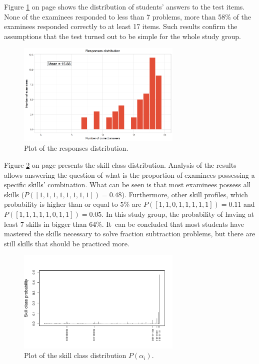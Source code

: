 \documentclass[english]{pwr_wmat_praca_dyplomowa}
\theoremstyle{plain}
\numberwithin{theorem}{chapter}
\theoremstyle{definition}
\numberwithin{theorem}{chapter}
\begin{document}
	Figure \ref{histogram_ans} on page \pageref{histogram_ans} shows the distribution of students' answers to the test items. None of the examinees responded to less than 7 problems, more than 58\% of the examinees responded correctly to at least 17 items. Such results confirm the assumptions that the test turned out to be simple for the whole study group. 
	
	\begin{figure}[h!]
		\centering
		\includegraphics[width=0.7\textwidth]{Responses_distribution.png}
		\caption{Plot of the responses distribution.}
		\label{histogram_ans}
	\end{figure}
	
	Figure \ref{skill_class_dist} on page \pageref{skill_class_dist} presents the skill class distribution. Analysis of the results allows answering the question of what is the proportion of examinees possessing a specific skills' combination. What can be seen is that most examinees possess all skills ($P([1,1,1,1,1,1,1,1])=0.48$). Furthermore, other skill profiles, which probability is higher than or equal to 5\% are $P([1,1,0,1,1,1,1,1])=0.11$ and $P([1,1,1,1,1,0,1,1])=0.05$. In this study group, the probability of having at least 7 skills in bigger than 64\%. It~can be concluded that most students have mastered the skills necessary to solve fraction subtraction problems, but there are still skills that should be practiced more.
	
	\begin{figure}[h!]
		\centering
		\includegraphics[width=0.7\textwidth]{Skill_class_probability_0.pdf}
		\caption{Plot of the skill class distribution $P(\alpha_i)$.}
		\label{skill_class_dist}
	\end{figure}
	
\end{document}

